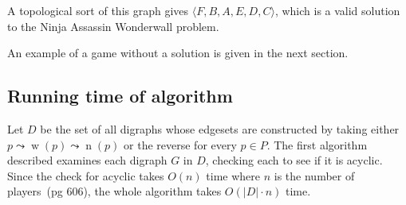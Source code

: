 \documentclass[12pt,x11names, rgb]{article}
\DeclareMathOperator{\w}{w}
\DeclareMathOperator{\n}{n}
\begin{document}
\begin{center}

    \end{center}

    A topological sort of this graph gives $\langle F, B, A, E, D, C \rangle$, which is a valid solution to the Ninja Assassin Wonderwall problem. 

    An example of a game without a solution is given in the next section.

\subsection{Running time of algorithm}
\label{sec:run-time}
    Let $D$ be the set of all digraphs whose edgesets are constructed by taking either $p \leadsto \w(p) \leadsto \n(p)$ or the reverse for every $p\in P$. The first algorithm described examines each digraph $G$ in $D$, checking each to see if it is acyclic. Since the check for acyclic takes $O(n)$ time where $n$ is the number of players~\cite{clrs}(pg 606), the whole algorithm takes $O(\lvert D \rvert \cdot n)$ time. 
\end{document}
